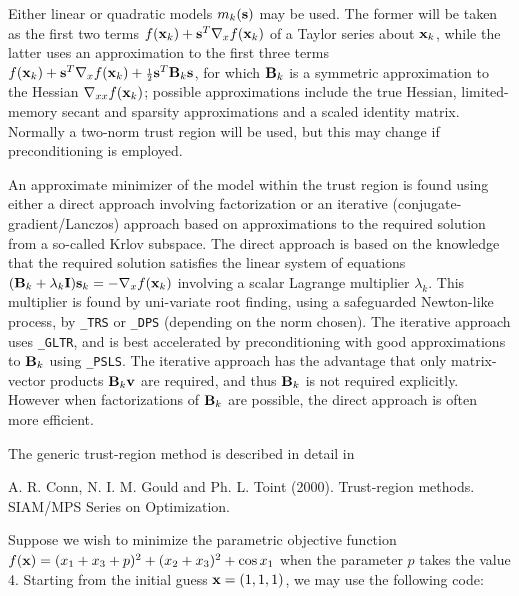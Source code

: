 \documentclass{galahad}
\begin{document}
Either linear or quadratic models $m_k({\mathbf{s}})$ may be used. The former will be
taken as the first two terms $f({\mathbf{x}}_k) + {\mathbf{s}}^T \nabla_x f({\mathbf{x}}_k)$
of a Taylor series about ${\mathbf{x}}_k$, while the latter uses an
approximation to the first three terms
$f({\mathbf{x}}_k) + {\mathbf{s}}^T \nabla_x f({\mathbf{x}}_k) + {\scriptstyle \frac{1}{2}}
{\mathbf{s}}^T {\mathbf{B}}_k {\mathbf{s}}$,
for which ${\mathbf{B}}_k$ is a symmetric approximation to the Hessian
$\nabla_{xx} f({\mathbf{x}}_k)$; possible approximations include the true Hessian,
limited-memory secant and sparsity approximations and a scaled identity matrix.
Normally a two-norm trust region will be used, but this may change
if preconditioning is employed.

An approximate minimizer of the model within the trust region
is found using either a direct approach involving factorization or an
iterative (conjugate-gradient/Lanczos) approach based on approximations
to the required solution from a so-called Krlov subspace. The direct
approach is based on the knowledge that the required solution
satisfies the linear system of equations $({\mathbf{B}}_k + \lambda_k {\mathbf{I}}) {\mathbf{s}}_k
= - \nabla_x f({\mathbf{x}}_k)$ involving a scalar Lagrange multiplier $\lambda_k$.
This multiplier is found by uni-variate root finding, using a safeguarded
Newton-like process, by {\tt \libraryname\_TRS} or {\tt \libraryname\_DPS}
(depending on the norm chosen). The iterative approach
uses {\tt \libraryname\_GLTR}, and is best accelerated by preconditioning
with good approximations to ${\mathbf{B}}_k$ using {\tt \libraryname\_PSLS}. The
iterative approach has the advantage that only matrix-vector products
${\mathbf{B}}_k {\mathbf{v}}$ are required, and thus ${\mathbf{B}}_k$ is not required explicitly.
However when factorizations of ${\mathbf{B}}_k$ are possible, the direct approach
is often more efficient.
\vspace*{1mm}

\galreferences
\vspace*{1mm}

\noindent
The generic trust-region method is described in detail in
\vspace*{1mm}

\noindent
A. R. Conn, N. I. M. Gould and Ph. L. Toint (2000).
Trust-region methods.
SIAM/MPS Series on Optimization.


\galexamples
Suppose we wish to minimize the parametric objective function
$f({\mathbf{x}}) = ( x_1 + x_3 + p )^2 + ( x_2 + x_3 )^2 + \cos x_1$
when the parameter $p$ takes the value 4. Starting from the
initial guess ${\mathbf{x}} = (1,1,1)$,
we may use the following code:
\end{document}
